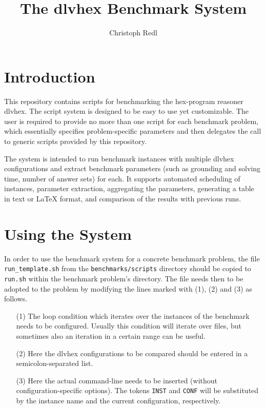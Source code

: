 \documentclass[a4paper]{article}
\newcommand{\dlvhex}{{\sc dlvhex}}
\newcommand{\hex}{{\sc hex}}
\begin{document}
	
	\title{The \dlvhex{} Benchmark System}
	\author{Christoph Redl}
	\maketitle
	
	\section{Introduction}
	\label{sec:introduction}
		
		This repository contains scripts for benchmarking the \hex-program reasoner \dlvhex.
		The script system is designed to be easy to use yet customizable.
		The user is required to provide no more than one script for each benchmark problem,
		which essentially specifies problem-specific parameters and then delegates the call
		to generic scripts provided by this repository.
		
		The system
		is intended to run benchmark instances with multiple \dlvhex{} configurations
		and extract benchmark parameters (such as grounding and solving time, number of answer sets) for each.
		It supports automated scheduling of instances, parameter extraction,
		aggregating the parameters,
		generating a table in text or \LaTeX{} format,
		and comparison of the results with previous runs.
			
	\section{Using the System}
	\label{sec:usage}
			
		In order to use the benchmark system for a concrete benchmark problem,
		the file {\tt run\_template.sh} from the {\tt benchmarks/scripts} directory
		should be copied to {\tt run.sh} within the benchmark problem's directory.
		The file needs then to be adopted to the problem by modifying the lines
		marked with (1), (2) and (3) as follows.
		\begin{enumerate}
		\item[(1)] The loop condition which iterates over the instances of the benchmark needs to be configured.
			Usually this condition will iterate over files, but sometimes also an iteration in a certain range can be useful.
		\item[(2)] Here the \dlvhex{} configurations to be compared should be entered in a semicolon-separated list.
		\item[(3)] Here the actual command-line needs to be inserted (without configuration-specific options).
			The tokens {\tt INST} and {\tt CONF} will be substituted by the instance name and the current configuration, respectively.
		\end{enumerate}
		
\end{document}
